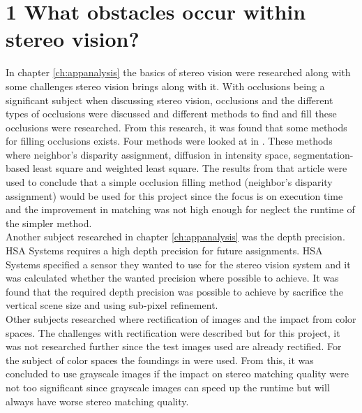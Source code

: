 \section*{1 What obstacles occur within stereo vision?}
In chapter \vref{ch:appanalysis} the basics of stereo vision were researched along with some challenges stereo vision brings along with it. With occlusions being a significant subject when discussing stereo vision, occlusions and the different types of occlusions were discussed and different methods to find and fill these occlusions were researched. From this research, it was found that some methods for filling occlusions exists. Four methods were looked at in \cite{huq2013occlusion}. These methods where neighbor's disparity assignment, diffusion in intensity space, segmentation-based least square and weighted least square. The results from that article were used to conclude that a simple occlusion filling method (neighbor's disparity assignment) would be used for this project since the focus is on execution time and the improvement in matching was not high enough for neglect the runtime of the simpler method.\\
Another subject researched in chapter \vref{ch:appanalysis} was the depth precision. HSA Systems requires a high depth precision for future assignments. HSA Systems specified a sensor they wanted to use for the stereo vision system and it was calculated whether the wanted precision where possible to achieve. It was found that the required depth precision was possible to achieve by sacrifice the vertical scene size and using sub-pixel refinement.\\
Other subjects researched where rectification of images and the impact from color spaces. The challenges with rectification were described but for this project, it was not researched further since the test images used are already rectified. For the subject of color spaces the foundings in \cite{chambon2005colour} were used. From this, it was concluded to use grayscale images if the impact on stereo matching quality were not too significant since grayscale images can speed up the runtime but will always have worse stereo matching quality.\\

